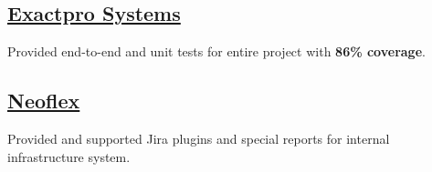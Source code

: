\documentclass[letter,10pt]{article}
\begin{document}
\subsection{{\large\href{https://exactpro.com/}{Exactpro Systems}}}
\begin{zitemize}
\item Provided end-to-end and unit tests for entire project with \textbf{86\% coverage}.
\end{zitemize}
\subsection{{\large\href{https://www.neoflex.ru/}{Neoflex}}}
\begin{zitemize}
\item Provided and supported Jira plugins and special reports for internal infrastructure system.
\end{zitemize}
\end{document}
